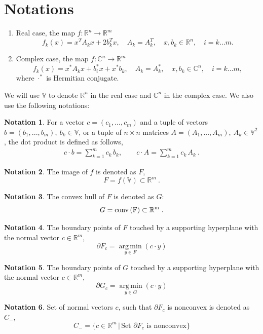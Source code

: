 \documentclass[a4paper]{article}
\DeclareMathOperator*{\argmin}{arg\,min}
\newcommand{\R}{\mathbb{R}}
\newcommand{\conv}{\rm{conv}\,}
\theoremstyle{definition}
\newtheorem{definition}{Notation}[]
\begin{document}
\newpage

\section*{Notations}
\begin{enumerate}
\item Real case, the map $f\colon \mathbb{R}^n\to\mathbb{R}^m$
\begin{equation}
f_k(x)=x^TA_k x+2b_k^Tx ,\quad A_k=A_k^T ,\quad x, b_k\in \mathbb{R}^n ,\quad i=k\dots m . \label{real}
\end{equation}
\item Complex case, the map $f\colon \mathbb{C}^n\to\mathbb{R}^m$
\begin{equation}
f_k(x)=x^*A_k x+b_i^*x+x^*b_k ,\quad A_k=A_k^* ,\quad x, b_k\in \mathbb{C}^n ,\quad i=k\dots m ,\label{complex}
\end{equation}
where $\cdot^*$ is Hermitian conjugate.
\end{enumerate}

We will use $\mathbb{V}$ to denote $\mathbb{R}^n$ in the real case and $\mathbb{C}^n$ in the  complex case.
We also use the following notations:\\

\theoremstyle{definition}
\begin{definition}
For a vector $c=(c_1,...,c_m)$ and a tuple of vectors $b=(b_1,...,b_m), \ b_k \in \mathbb{V}$, or a tuple of $n\times n$ matrices $A=(A_1,...,A_m), \  A_k\in \mathbb{V}^2$, the dot product is defined as follows,
\begin{eqnarray}
c\cdot b=\sum\limits_{k=1}^m c_k\, b_k ,\qquad
c\cdot A=\sum\limits_{k=1}^m c_k\, A_k\ . \nonumber
\end{eqnarray}
\end{definition}

\begin{definition}
The image of $f$ is denoted as $F$,
	$$F=f(\mathbb{V})\subset \mathbb{R}^m\ .$$
\end{definition}
\begin{definition} The convex hull of $F$ is denoted as $G$:
	$$G=\conv (F)\subset \mathbb{R}^m\ .$$
\end{definition}
\begin{definition} The boundary points of $F$ touched by a supporting hyperplane with the normal vector $c\in\mathbb{R}^m$,
	$$\partial F_c=\argmin\limits_{y\in F}(c\cdot y)$$
\end{definition}
\begin{definition} The boundary points of $G$ touched by a supporting hyperplane with the normal vector $c\in\mathbb{R}^m$,
	$$\partial G_c=\argmin\limits_{y\in G}(c\cdot y)$$
\end{definition}
\begin{definition}\label{ex:c_minus}
	Set of normal vectors $c$, such that $\partial F_c$ is nonconvex is denoted as $C_-$,
	$$C_-=\{c\in\R^m\,\big|\,\mbox{Set }\partial F_c\mbox{ is nonconvex}\}$$
\end{definition}
\end{document}
